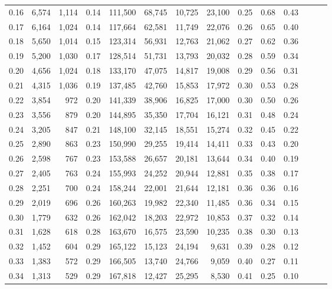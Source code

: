 \begin{tabular}{rrrrrrrrrrrrrr}
0.16 &  6,574 &  1,114 &  0.14 &  111,500 &   68,745 &  10,725 &  23,100 &  0.25 &  0.68 &      0.43 \\
0.17 &  6,164 &  1,024 &  0.14 &  117,664 &   62,581 &  11,749 &  22,076 &  0.26 &  0.65 &      0.40 \\
0.18 &  5,650 &  1,014 &  0.15 &  123,314 &   56,931 &  12,763 &  21,062 &  0.27 &  0.62 &      0.36 \\
0.19 &  5,200 &  1,030 &  0.17 &  128,514 &   51,731 &  13,793 &  20,032 &  0.28 &  0.59 &      0.34 \\
0.20 &  4,656 &  1,024 &  0.18 &  133,170 &   47,075 &  14,817 &  19,008 &  0.29 &  0.56 &      0.31 \\
0.21 &  4,315 &  1,036 &  0.19 &  137,485 &   42,760 &  15,853 &  17,972 &  0.30 &  0.53 &      0.28 \\
0.22 &  3,854 &    972 &  0.20 &  141,339 &   38,906 &  16,825 &  17,000 &  0.30 &  0.50 &      0.26 \\
0.23 &  3,556 &    879 &  0.20 &  144,895 &   35,350 &  17,704 &  16,121 &  0.31 &  0.48 &      0.24 \\
0.24 &  3,205 &    847 &  0.21 &  148,100 &   32,145 &  18,551 &  15,274 &  0.32 &  0.45 &      0.22 \\
0.25 &  2,890 &    863 &  0.23 &  150,990 &   29,255 &  19,414 &  14,411 &  0.33 &  0.43 &      0.20 \\
0.26 &  2,598 &    767 &  0.23 &  153,588 &   26,657 &  20,181 &  13,644 &  0.34 &  0.40 &      0.19 \\
0.27 &  2,405 &    763 &  0.24 &  155,993 &   24,252 &  20,944 &  12,881 &  0.35 &  0.38 &      0.17 \\
0.28 &  2,251 &    700 &  0.24 &  158,244 &   22,001 &  21,644 &  12,181 &  0.36 &  0.36 &      0.16 \\
0.29 &  2,019 &    696 &  0.26 &  160,263 &   19,982 &  22,340 &  11,485 &  0.36 &  0.34 &      0.15 \\
0.30 &  1,779 &    632 &  0.26 &  162,042 &   18,203 &  22,972 &  10,853 &  0.37 &  0.32 &      0.14 \\
0.31 &  1,628 &    618 &  0.28 &  163,670 &   16,575 &  23,590 &  10,235 &  0.38 &  0.30 &      0.13 \\
0.32 &  1,452 &    604 &  0.29 &  165,122 &   15,123 &  24,194 &   9,631 &  0.39 &  0.28 &      0.12 \\
0.33 &  1,383 &    572 &  0.29 &  166,505 &   13,740 &  24,766 &   9,059 &  0.40 &  0.27 &      0.11 \\
0.34 &  1,313 &    529 &  0.29 &  167,818 &   12,427 &  25,295 &   8,530 &  0.41 &  0.25 &      0.10 \\

\end{tabular}

